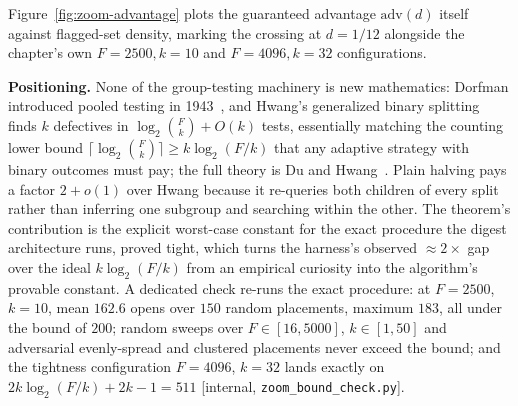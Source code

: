 \documentclass[11pt,a4paper]{article}
\theoremstyle{definition}
\theoremstyle{plain}
\begin{document}

Figure~\ref{fig:zoom-advantage} plots the guaranteed advantage
$\mathrm{adv}(d)$ itself against flagged-set density, marking the crossing
at $d=1/12$ alongside the chapter's own $F{=}2500,k{=}10$ and
$F{=}4096,k{=}32$ configurations.

\noindent\textbf{Positioning.} None of the group-testing machinery is new
mathematics: Dorfman introduced pooled testing in 1943~, and Hwang's
generalized binary splitting~ finds $k$ defectives in
$\log_2\binom{F}{k}+O(k)$ tests, essentially matching the counting lower bound
$\lceil\log_2\binom{F}{k}\rceil\ge k\log_2(F/k)$ that any adaptive strategy with
binary outcomes must pay; the full theory is Du and Hwang~. Plain
halving pays a factor $2+o(1)$ over Hwang because it re-queries both children of
every split rather than inferring one subgroup and searching within the other. The
theorem's contribution is the explicit worst-case constant for the exact procedure
the digest architecture runs, proved tight, which turns the harness's observed
$\approx 2\times$ gap over the ideal $k\log_2(F/k)$ from an empirical curiosity into
the algorithm's provable constant. A dedicated check re-runs the exact procedure:
at $F{=}2500$, $k{=}10$, mean $162.6$ opens over $150$ random placements, maximum
$183$, all under the bound of $200$; random sweeps over $F\in[16,5000]$,
$k\in[1,50]$ and adversarial evenly-spread and clustered placements never exceed
the bound; and the tightness configuration $F{=}4096$, $k{=}32$ lands exactly on
$2k\log_2(F/k)+2k-1=511$ [internal, \texttt{zoom\_bound\_check.py}].
\end{document}
